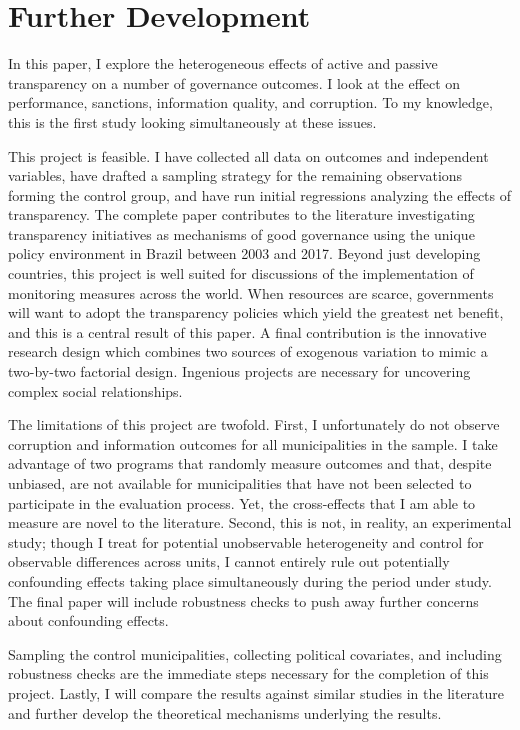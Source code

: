 \documentclass[11pt]{article}
\begin{document}
\section{Further Development} \label{sec:conclusion_paper3}

In this paper, I explore the heterogeneous effects of active and passive transparency on a number of governance outcomes. I look at the effect on performance, sanctions, information quality, and corruption. To my knowledge, this is the first study looking simultaneously at these issues.

This project is feasible. I have collected all data on outcomes and independent variables, have drafted a sampling strategy for the remaining observations forming the control group, and have run initial regressions analyzing the effects of transparency. The complete paper contributes to the literature investigating transparency initiatives as mechanisms of good governance using the unique policy environment in Brazil between 2003 and 2017. Beyond just developing countries, this project is well suited for discussions of the implementation of monitoring measures across the world. When resources are scarce, governments will want to adopt the transparency policies which yield the greatest net benefit, and this is a central result of this paper. A final contribution is the innovative research design which combines two sources of exogenous variation to mimic a two-by-two factorial design. Ingenious projects are necessary for uncovering complex social relationships.

The limitations of this project are twofold. First, I unfortunately do not observe corruption and information outcomes for all municipalities in the sample. I take advantage of two programs that randomly measure outcomes and that, despite unbiased, are not available for municipalities that have not been selected to participate in the evaluation process. Yet, the cross-effects that I am able to measure are novel to the literature. Second, this is not, in reality, an experimental study; though I treat for potential unobservable heterogeneity and control for observable differences across units, I cannot entirely rule out potentially confounding effects taking place simultaneously during the period under study. The final paper will include robustness checks to push away further concerns about confounding effects.

Sampling the control municipalities, collecting political covariates, and including robustness checks are the immediate steps necessary for the completion of this project. Lastly, I will compare the results against similar studies in the literature and further develop the theoretical mechanisms underlying the results.

\clearpage

\setlength\bibsep{0pt}


\end{document}
